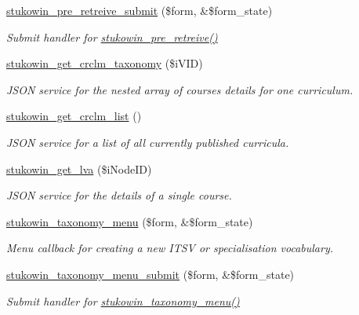 \begin{DoxyCompactItemize}
\hyperlink{group___c_e_u_s2_drupal_ga433b18d1cf617b28cca3fc0dd47d8062}{stukowin\+\_\+pre\+\_\+retreive\+\_\+submit} (\$form, \&\$form\+\_\+state)
\begin{DoxyCompactList}\small\item\em Submit handler for \hyperlink{group___c_e_u_s2_drupal_ga481789ce9904fc10aefb8eaf7534133b}{stukowin\+\_\+pre\+\_\+retreive()} \end{DoxyCompactList}\item 
\hyperlink{group___drupal2_a_g_g_gaf137f10bef98707dacaf33d6581773d0}{stukowin\+\_\+get\+\_\+crclm\+\_\+taxonomy} (\$i\+V\+I\+D)
\begin{DoxyCompactList}\small\item\em J\+S\+O\+N service for the nested array of courses details for one curriculum. \end{DoxyCompactList}\item 
\hyperlink{group___drupal2_a_g_g_gad0cb4d7faa68097f5b7df8311e36b22e}{stukowin\+\_\+get\+\_\+crclm\+\_\+list} ()
\begin{DoxyCompactList}\small\item\em J\+S\+O\+N service for a list of all currently published curricula. \end{DoxyCompactList}\item 
\hyperlink{group___drupal2_a_g_g_ga7522e206f1a87971b916a7a0be0098c6}{stukowin\+\_\+get\+\_\+lva} (\$i\+Node\+I\+D)
\begin{DoxyCompactList}\small\item\em J\+S\+O\+N service for the details of a single course. \end{DoxyCompactList}\item 
\hyperlink{group___drupal2_i_t_s_v_gab706d935ca9d9998c5e25a9ad6486d6a}{stukowin\+\_\+taxonomy\+\_\+menu} (\$form, \&\$form\+\_\+state)
\begin{DoxyCompactList}\small\item\em Menu callback for creating a new I\+T\+S\+V or specialisation vocabulary. \end{DoxyCompactList}\item 
\hyperlink{group___drupal2_i_t_s_v_ga5fb85a53362f6fef40035a6c350c11ea}{stukowin\+\_\+taxonomy\+\_\+menu\+\_\+submit} (\$form, \&\$form\+\_\+state)
\begin{DoxyCompactList}\small\item\em Submit handler for \hyperlink{group___drupal2_i_t_s_v_gab706d935ca9d9998c5e25a9ad6486d6a}{stukowin\+\_\+taxonomy\+\_\+menu()} \end{DoxyCompactList}\item 

\end{DoxyCompactItemize}
